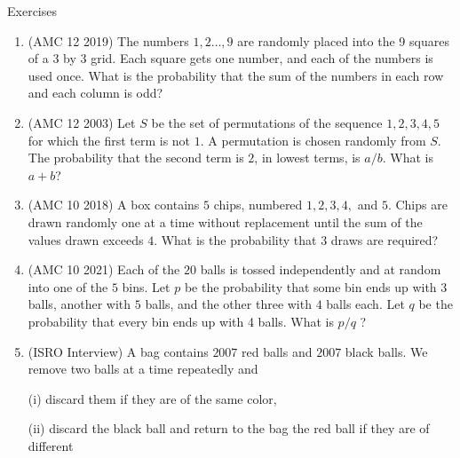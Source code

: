 \begin{xcb}{Exercises}
\begin{enumerate}
\begin{hint}
\end{hint}
\item (AMC 12 2019)  The numbers $1,2 \dots ,9$ are randomly placed into the 9 squares of a 3 by 3 grid. Each square gets one number, and each of the numbers is used once. What is the probability that the sum of the numbers in each row and each column is odd?\par
\begin{hint}
\end{hint}
\item (AMC 12 2003)  Let $S$ be the set of permutations of the sequence $1, 2, 3, 4, 5$ for which the first term is not $1$. A permutation is chosen randomly from $S$. The probability that the second term is $2$, in lowest terms, is $a/b$. What is $a + b$?
\item (AMC 10 2018)  A box contains $5$ chips, numbered $1, 2, 3, 4,$ and $5$. Chips are drawn randomly one at a time without replacement until the sum of the values drawn exceeds $4$. What is the probability that $3$ draws are required?
\begin{hint}
\end{hint}
\item (AMC 10 2021)  Each of the $20$ balls is tossed independently and at random into one of the $5$ bins. Let $p$ be the probability that some bin ends up with $3$ balls, another with $5$ balls, and the other three with $4$ balls each. Let $q$ be the probability that every bin ends up with 4 balls. What is $p/q$ ?
\begin{hint}
\end{hint}
\item (ISRO Interview)  A bag contains $2007$ red balls and $2007$ black balls. We remove two balls
at a time repeatedly and\par
(i) discard them if they are of the same color,\par
(ii) discard the black ball and return to the bag the red ball if they are of different

\end{enumerate}
\end{xcb}
